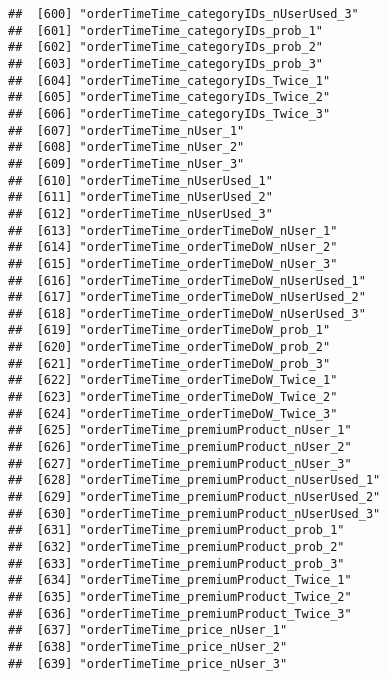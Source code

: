 \documentclass[10pt]{report}
\begin{document}
\begin{verbatim}
##  [600] "orderTimeTime_categoryIDs_nUserUsed_3"                
##  [601] "orderTimeTime_categoryIDs_prob_1"                     
##  [602] "orderTimeTime_categoryIDs_prob_2"                     
##  [603] "orderTimeTime_categoryIDs_prob_3"                     
##  [604] "orderTimeTime_categoryIDs_Twice_1"                    
##  [605] "orderTimeTime_categoryIDs_Twice_2"                    
##  [606] "orderTimeTime_categoryIDs_Twice_3"                    
##  [607] "orderTimeTime_nUser_1"                                
##  [608] "orderTimeTime_nUser_2"                                
##  [609] "orderTimeTime_nUser_3"                                
##  [610] "orderTimeTime_nUserUsed_1"                            
##  [611] "orderTimeTime_nUserUsed_2"                            
##  [612] "orderTimeTime_nUserUsed_3"                            
##  [613] "orderTimeTime_orderTimeDoW_nUser_1"                   
##  [614] "orderTimeTime_orderTimeDoW_nUser_2"                   
##  [615] "orderTimeTime_orderTimeDoW_nUser_3"                   
##  [616] "orderTimeTime_orderTimeDoW_nUserUsed_1"               
##  [617] "orderTimeTime_orderTimeDoW_nUserUsed_2"               
##  [618] "orderTimeTime_orderTimeDoW_nUserUsed_3"               
##  [619] "orderTimeTime_orderTimeDoW_prob_1"                    
##  [620] "orderTimeTime_orderTimeDoW_prob_2"                    
##  [621] "orderTimeTime_orderTimeDoW_prob_3"                    
##  [622] "orderTimeTime_orderTimeDoW_Twice_1"                   
##  [623] "orderTimeTime_orderTimeDoW_Twice_2"                   
##  [624] "orderTimeTime_orderTimeDoW_Twice_3"                   
##  [625] "orderTimeTime_premiumProduct_nUser_1"                 
##  [626] "orderTimeTime_premiumProduct_nUser_2"                 
##  [627] "orderTimeTime_premiumProduct_nUser_3"                 
##  [628] "orderTimeTime_premiumProduct_nUserUsed_1"             
##  [629] "orderTimeTime_premiumProduct_nUserUsed_2"             
##  [630] "orderTimeTime_premiumProduct_nUserUsed_3"             
##  [631] "orderTimeTime_premiumProduct_prob_1"                  
##  [632] "orderTimeTime_premiumProduct_prob_2"                  
##  [633] "orderTimeTime_premiumProduct_prob_3"                  
##  [634] "orderTimeTime_premiumProduct_Twice_1"                 
##  [635] "orderTimeTime_premiumProduct_Twice_2"                 
##  [636] "orderTimeTime_premiumProduct_Twice_3"                 
##  [637] "orderTimeTime_price_nUser_1"                          
##  [638] "orderTimeTime_price_nUser_2"                          
##  [639] "orderTimeTime_price_nUser_3"                          

\end{verbatim}
\end{document}

